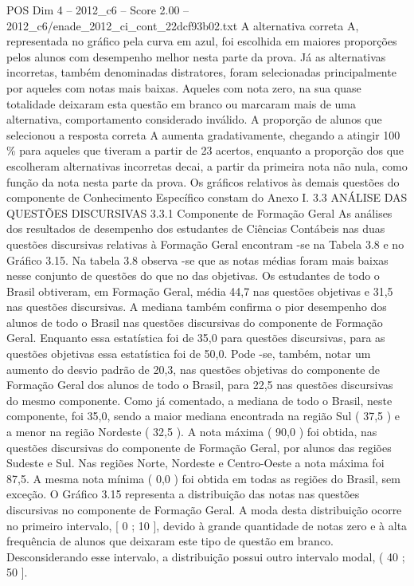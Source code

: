 \begin{textsample}{POS Dim 4 – 2012\_c6 – Score 2.00 – 2012\_c6/enade\_2012\_ci\_cont\_22dcf93b02.txt}
A alternativa correta A, representada no gráfico pela curva em azul, foi escolhida em maiores proporções pelos alunos com desempenho melhor nesta parte da prova.
Já as alternativas incorretas, também denominadas distratores, foram selecionadas principalmente por aqueles com notas mais baixas.
Aqueles com nota zero, na sua quase totalidade deixaram esta questão em branco ou marcaram mais de uma alternativa, comportamento considerado inválido.
A proporção de alunos que selecionou a resposta correta A aumenta gradativamente, chegando a atingir 100 \% para aqueles que tiveram a partir de 23 acertos, enquanto a proporção dos que escolheram alternativas incorretas decai, a partir da primeira nota não nula, como função da nota nesta parte da prova.
Os gráficos relativos às demais questões do componente de Conhecimento Específico constam do Anexo I. 3.3 ANÁLISE DAS QUESTÕES DISCURSIVAS 3.3.1 Componente de Formação Geral As análises dos resultados de desempenho dos estudantes de Ciências Contábeis nas duas questões discursivas relativas à Formação Geral encontram -se na Tabela 3.8 e no Gráfico 3.15.
Na tabela 3.8 observa -se que as notas médias foram mais baixas nesse conjunto de questões do que no das objetivas.
Os estudantes de todo o Brasil obtiveram, em Formação Geral, média 44,7 nas questões objetivas e 31,5 nas questões discursivas.
A mediana também confirma o pior desempenho dos alunos de todo o Brasil nas questões discursivas do componente de Formação Geral.
Enquanto essa estatística foi de 35,0 para questões discursivas, para as questões objetivas essa estatística foi de 50,0.
Pode -se, também, notar um aumento do desvio padrão de 20,3, nas questões objetivas do componente de Formação Geral dos alunos de todo o Brasil, para 22,5 nas questões discursivas do mesmo componente.
Como já comentado, a mediana de todo o Brasil, neste componente, foi 35,0, sendo a maior mediana encontrada na região Sul ( 37,5 ) e a menor na região Nordeste ( 32,5 ).
A nota máxima ( 90,0 ) foi obtida, nas questões discursivas do componente de Formação Geral, por alunos das regiões Sudeste e Sul.
Nas regiões Norte, Nordeste e Centro-Oeste a nota máxima foi 87,5.
A mesma nota mínima ( 0,0 ) foi obtida em todas as regiões do Brasil, sem exceção.
O Gráfico 3.15 representa a distribuição das notas nas questões discursivas no componente de Formação Geral.
A moda desta distribuição ocorre no primeiro intervalo, [ 0 ; 10 ], devido à grande quantidade de notas zero e à alta frequência de alunos que deixaram este tipo de questão em branco.
Desconsiderando esse intervalo, a distribuição possui outro intervalo modal, ( 40 ; 50 ].

\end{textsample}
